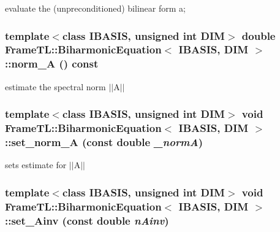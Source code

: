 evaluate the (unpreconditioned) bilinear form a; \hypertarget{classFrameTL_1_1BiharmonicEquation_14e15fda0b1f3cc901cb3a3026ceb536}{
\subsubsection[norm\_\-A]{\setlength{\rightskip}{0pt plus 5cm}template$<$class IBASIS, unsigned int DIM$>$ double {\bf FrameTL::BiharmonicEquation}$<$ IBASIS, DIM $>$::norm\_\-A () const}}
\label{classFrameTL_1_1BiharmonicEquation_14e15fda0b1f3cc901cb3a3026ceb536}


estimate the spectral norm $|$$|$A$|$$|$ \hypertarget{classFrameTL_1_1BiharmonicEquation_731c3491306a23684256fe4dede66b53}{
\subsubsection[set\_\-norm\_\-A]{\setlength{\rightskip}{0pt plus 5cm}template$<$class IBASIS, unsigned int DIM$>$ void {\bf FrameTL::BiharmonicEquation}$<$ IBASIS, DIM $>$::set\_\-norm\_\-A (const double {\em \_\-normA})}}
\label{classFrameTL_1_1BiharmonicEquation_731c3491306a23684256fe4dede66b53}


sets estimate for $|$$|$A$|$$|$ \hypertarget{classFrameTL_1_1BiharmonicEquation_390c7b64b0183610aede9842c805804e}{
\subsubsection[set\_\-Ainv]{\setlength{\rightskip}{0pt plus 5cm}template$<$class IBASIS, unsigned int DIM$>$ void {\bf FrameTL::BiharmonicEquation}$<$ IBASIS, DIM $>$::set\_\-Ainv (const double {\em nAinv})}}
\label{classFrameTL_1_1BiharmonicEquation_390c7b64b0183610aede9842c805804e}


